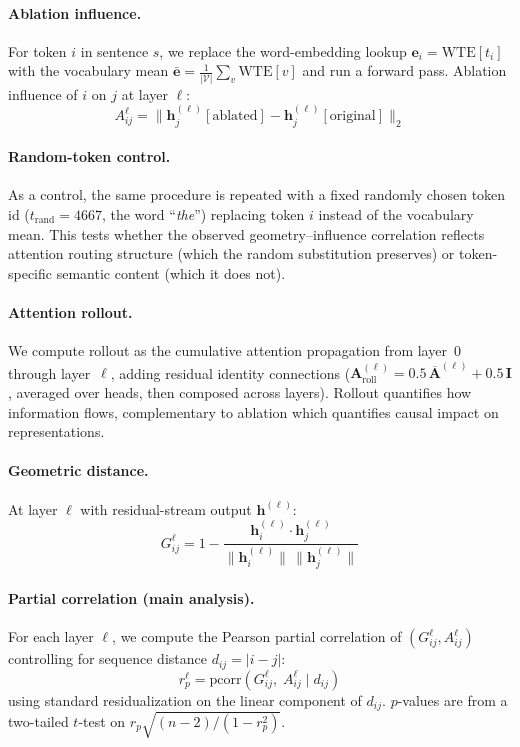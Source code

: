 \documentclass[11pt,a4paper]{article}
\begin{document}
\paragraph{Ablation influence.}
For token $i$ in sentence $s$, we replace the word-embedding lookup
$\mathbf{e}_i = \mathrm{WTE}[t_i]$ with the vocabulary mean
$\bar{\mathbf{e}} = \frac{1}{|\mathcal{V}|}\sum_{v} \mathrm{WTE}[v]$
and run a forward pass.
Ablation influence of $i$ on $j$ at layer $\ell$:
\begin{equation}
  A_{ij}^\ell = \|\mathbf{h}_j^{(\ell)}[\text{ablated}] - \mathbf{h}_j^{(\ell)}[\text{original}]\|_2
\end{equation}

\paragraph{Random-token control.}
As a control, the same procedure is repeated with a fixed randomly chosen
token id ($t_{\mathrm{rand}} = 4667$, the word ``\textit{the}'') replacing token $i$
instead of the vocabulary mean.
This tests whether the observed geometry--influence correlation reflects
attention routing structure (which the random substitution preserves)
or token-specific semantic content (which it does not).

\paragraph{Attention rollout.}
We compute rollout \cite{abnar2020quantifying} as the cumulative attention
propagation from layer~0 through layer~$\ell$, adding residual identity
connections ($\mathbf{A}^{(\ell)}_\mathrm{roll} = 0.5\,\overline{\mathbf{A}}^{(\ell)} + 0.5\,\mathbf{I}$,
averaged over heads, then composed across layers).
Rollout quantifies how information flows, complementary to ablation which
quantifies causal impact on representations.

\paragraph{Geometric distance.}
At layer $\ell$ with residual-stream output $\mathbf{h}^{(\ell)}$:
\begin{equation}
  G_{ij}^\ell = 1 - \frac{\mathbf{h}_i^{(\ell)} \cdot \mathbf{h}_j^{(\ell)}}
                          {\|\mathbf{h}_i^{(\ell)}\|\,\|\mathbf{h}_j^{(\ell)}\|}
\end{equation}

\paragraph{Partial correlation (main analysis).}
For each layer $\ell$, we compute the Pearson partial correlation of
$(G_{ij}^\ell, A_{ij}^\ell)$ controlling for sequence distance
$d_{ij} = |i - j|$:
\begin{equation}
  r_p^\ell = \mathrm{pcorr}(G_{ij}^\ell,\; A_{ij}^\ell \mid d_{ij})
\end{equation}
using standard residualization on the linear component of $d_{ij}$.
$p$-values are from a two-tailed $t$-test on $r_p\sqrt{(n-2)/(1-r_p^2)}$.
\end{document}
